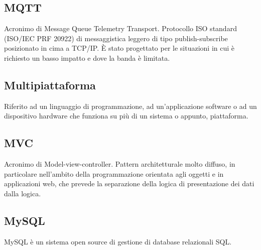 \subsection*{MQTT}
Acronimo di Message Queue Telemetry Transport. Protocollo ISO standard (ISO/IEC PRF 20922) di messaggistica leggero di tipo publish-subscribe posizionato in cima a TCP/IP. È stato progettato per le situazioni in cui è richiesto un basso impatto e dove la banda è limitata. 

\subsection*{Multipiattaforma}
Riferito ad un linguaggio di programmazione, ad un'applicazione software o ad un dispositivo hardware che funziona su più di un sistema o appunto, piattaforma.

\subsection*{MVC}
Acronimo di Model-view-controller. Pattern architetturale molto diffuso, in particolare nell'ambito della programmazione orientata agli oggetti e in applicazioni web, che prevede la separazione della logica di presentazione dei dati dalla logica.

\subsection*{MySQL}
MySQL è un sistema open source di gestione di database relazionali SQL.